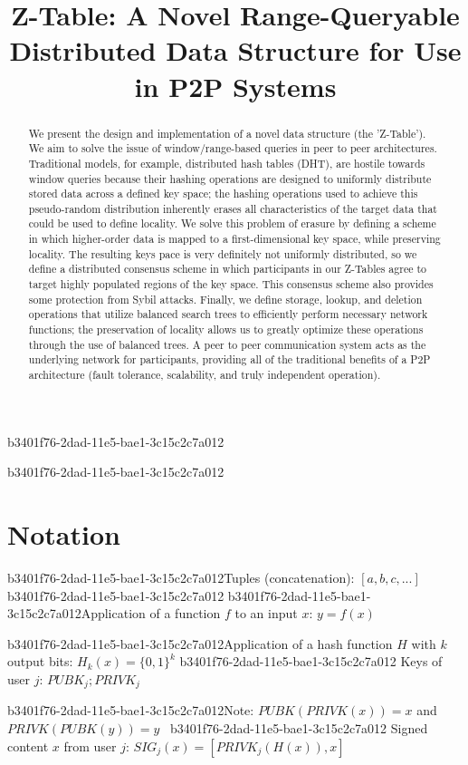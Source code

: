 \documentclass[12pt]{article}
\title{Z-Table: A Novel Range-Queryable Distributed Data Structure for Use in P2P Systems}
\begin{document}
b3401f76-2dad-11e5-bae1-3c15c2c7a012\maketitle

\begin{abstract}
We present the design and implementation of a novel data structure (the 'Z-Table'). We aim to solve the issue of window/range-based queries in peer to peer architectures. Traditional models, for example,  distributed hash tables (DHT), are hostile towards window queries because their hashing operations are designed to uniformly distribute stored data across a defined key space; the hashing operations used to achieve this pseudo-random distribution inherently erases all characteristics of the target data that could be used to define locality. We solve this problem of erasure by defining a scheme in which higher-order data is mapped to a first-dimensional key space, while preserving locality. The resulting keys pace is very definitely not uniformly distributed, so we define a distributed consensus scheme in which participants in our Z-Tables agree to target highly populated regions of the key space. This consensus scheme also provides some protection from Sybil attacks. Finally, we define storage, lookup, and deletion operations that utilize balanced search trees to efficiently perform necessary network functions; the preservation of locality allows us to greatly optimize these operations through the use of balanced trees. A peer to peer communication system acts as the underlying network for participants, providing all of the traditional benefits of a P2P architecture (fault tolerance, scalability, and truly independent operation).
\end{abstract}
b3401f76-2dad-11e5-bae1-3c15c2c7a012
\section{Notation}

b3401f76-2dad-11e5-bae1-3c15c2c7a012Tuples (concatenation): $[a,b,c,...]$
b3401f76-2dad-11e5-bae1-3c15c2c7a012
b3401f76-2dad-11e5-bae1-3c15c2c7a012Application of a function $f$ to an input $x$: $y=f(x)$

b3401f76-2dad-11e5-bae1-3c15c2c7a012Application of a hash function $H$ with $k$ output bits: $H_{k}(x) = \{0,1\}^k$
b3401f76-2dad-11e5-bae1-3c15c2c7a012
Keys of user $j$: $ PUBK_j; PRIVK_j $

b3401f76-2dad-11e5-bae1-3c15c2c7a012Note: $PUBK(PRIVK(x)) = x$ and $PRIVK(PUBK(y)) = y$~
b3401f76-2dad-11e5-bae1-3c15c2c7a012
Signed content $x$ from user $j$: $SIG_j(x) = \left[ PRIVK_j( H(x) ), x \right]$
\end{document}
